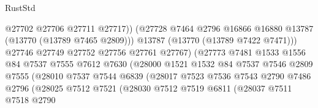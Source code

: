 \begin{lexlean}{RustStd}
\begin{coremodule}
                                        @27702
                                        @27706
                                        @27711
                                        @27717))
                                    (@27728
                                      @7464
                                      @2796
                                      @16866
                                      @16880
                                      @13787
                                      (@13770 (@13789 @7465 @2809)))
                                    @13787
                                    (@13770 (@13789 @7422 @7471)))
                                  @27746
                                  @27749
                                  @27752
                                  @27756
                                  @27761
                                  @27767)
                                (@27773
                                  @7481
                                  @1533
                                  @1556
                                  @84
                                  @7537
                                  @7555
                                  @7612
                                  @7630
                                  (@28000
                                    @1521
                                    @1532
                                    @84
                                    @7537
                                    @7546
                                    @2809
                                    @7555
                                    (@28010
                                      @7537
                                      @7544
                                      @6839
                                      (@28017
                                        @7523
                                        @7536
                                        @7543
                                        @2790
                                        @7486
                                        @2796
                                        (@28025
                                          @7512
                                          @7521
                                          (@28030
                                            @7512
                                            @7519
                                            @6811
                                            (@28037
                                              @7511
                                              @7518
                                              @2790

\end{coremodule}
\end{lexlean}
